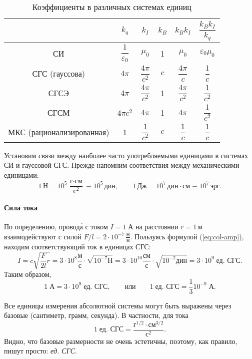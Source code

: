 \begin{table}
\small
\renewcommand{\arraystretch}{2}
\caption{Коэффициенты в различных системах единиц}
\centering
\begin{tabular}{c|ccccc}
\toprule
 & $k_{q}$ & $k_{I}$ & $k_{B}$ & $k_{B}k_{I}$
 & $\dfrac{k_{B}k_{I}}{k_{q}}$\\
\midrule
СИ & $\dfrac{1}{\varepsilon_{0}}$ & $\mu_{0}$ & 1 & $\mu_{0}$
& $\varepsilon_{0}\mu_{0}$\\[1ex] \hline
СГС (гауссова) & $4\pi$ & $\dfrac{4\pi}{c^{2}}$ & $c$ & $\dfrac{4\pi}{c}$ & $\dfrac{1}{c}$ \\[1ex] \hline
СГСЭ & $4\pi$ & $\dfrac{4\pi}{c^{2}}$ & 1 & $\dfrac{4\pi}{c^{2}}$
& $\dfrac{1}{c^{2}}$ \\[1ex] \hline
СГСМ & $4\pi c^{2}$ & $4\pi$ & 1 & $4\pi$ & $\dfrac{1}{c^{2}}$ \\[1ex] \hline
МКС (рационализированная) & 1 & $\dfrac{1}{c^{2}}$ & $c$ & $\dfrac{1}{c}$ & $\dfrac{1}{c}$\\
\bottomrule
\end{tabular}
\end{table}
Установим связи между наиболее часто употребляемыми единицами в системах
СИ и гауссовой СГС. Прежде напомним соответствия между механическими
единицами:
\[
1\,\text{Н}=10^{5}\,\frac{\text{г}\cdot\text{см}}{\text{с}^{2}}\equiv10^{5}\,\text{дин},\qquad1\,\text{Дж}=10^{7}\,\text{дин}\cdot\text{см}\equiv10^{7}\,\text{эрг}.
\]


\paragraph{Сила тока}

По определению, провод\'{а} с током $I=1\;\text{А}$ на расстоянии
$r=1\,\text{м}$ взаимодействуют с силой $F/l=2\cdot10^{-7}\,\frac{\text{Н}}{\text{м}}$.
Пользуясь формулой (\ref{eq:col-amp}), находим соответствующий ток
в единицах СГС:
\[
I=c\sqrt{\frac{F}{2l}r}=3\cdot10^{8}\frac{\text{м}}{\text{с}}\cdot\sqrt{10^{-7}\text{Н}}=3\cdot10^{10}\frac{\text{см}}{\text{с}}\cdot\sqrt{10^{-2}\text{дин}}=3\cdot10^{9}\;\text{ед. СГС}.
\]
Таким образом,
\[
1\;\text{А}=3\cdot10^{9}\;\text{ед. СГС},\qquad\text{или}\qquad1\;\text{ед. СГС}=\frac{1}{3}10^{-9}\;\text{А}.
\]

Все единицы измерения абсолютной системы могут быть выражены через
базовые (сантиметр, грамм, секунда). В частности, для тока
\[
1\;\text{ед. СГС}=\frac{\text{г}^{1/2}\cdot\text{см}^{3/2}}{\text{с}^{2}}.
\]
Видно, что базовые размерности не очень эстетичны, поэтому, как правило,
пишут просто: \emph{ед. СГС}.

